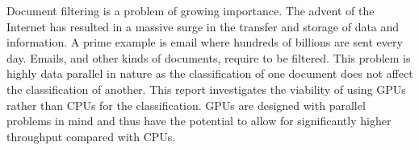 Document filtering is a problem of growing importance. The advent of the
Internet has resulted in a massive surge in the transfer and storage of data and
information. A prime example is email where hundreds of billions are sent every
day. Emails, and other kinds of documents, require to be filtered. This problem
is highly data parallel in nature as the classification of one document does not
affect the classification of another. This report investigates the viability of
using GPUs rather than CPUs for the classification. GPUs are designed with
parallel problems in mind and thus have the potential to allow for significantly
higher throughput compared with CPUs.
